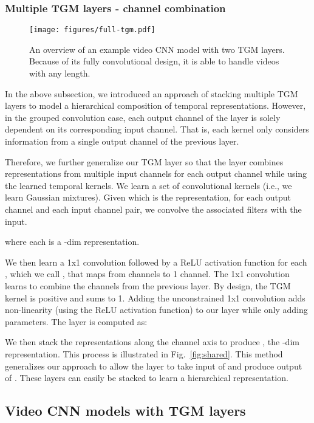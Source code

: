 \documentclass{article}
\begin{document}
\subsubsection{Multiple TGM layers - channel combination}
\begin{figure*}
    \centering
    \texttt{[image: figures/full-tgm.pdf]}
    \caption{An overview of an example video CNN model with two TGM layers. Because of its fully convolutional design, it is able to handle videos with any length.}
    \label{fig:model-overview}
\end{figure*}

In the above subsection, we introduced an approach of stacking multiple TGM layers to model a hierarchical composition of temporal representations. However, in the grouped convolution case, each output channel of the layer is solely dependent on its corresponding input channel. That is, each kernel only considers information from a single output channel of the previous layer.

Therefore, we further generalize our TGM layer so that the layer combines representations from multiple input channels for each output channel while using the learned temporal kernels. We learn a set of convolutional kernels  (i.e., we learn  Gaussian mixtures). Given  which is the  representation, for each output channel  and each input channel  pair, we convolve the associated filters with the input.

where each  is a -dim representation.


We then learn a 1x1 convolution followed by a ReLU activation function for each , which we call , that maps from  channels to 1 channel. The 1x1 convolution learns to combine the channels from the previous layer. By design, the TGM kernel is positive and sums to 1. Adding the unconstrained 1x1 convolution adds non-linearity (using the ReLU activation function) to our layer while only adding  parameters. The layer is computed as:


We then stack the  representations along the channel axis to produce , the -dim representation. This process is illustrated in Fig.~\ref{fig:shared}. This method generalizes our approach to allow the layer to take input of  and produce output of . These layers can easily be stacked to learn a hierarchical representation.


\subsection{Video CNN models with TGM layers}
\label{subsec:model}
\end{document}
